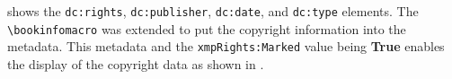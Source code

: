 \documentclass[12pt, twoside]{article}
\begin{document}

 shows the \texttt{dc:rights}, \texttt{dc:publisher}, \texttt{dc:date}, and \texttt{dc:type} elements. The \texttt{\textbackslash bookinfomacro} was extended to put the copyright information into the metadata. This metadata and the \texttt{xmpRights:Marked} value being \textbf{True} enables the display of the copyright data as shown in .
\end{document}
